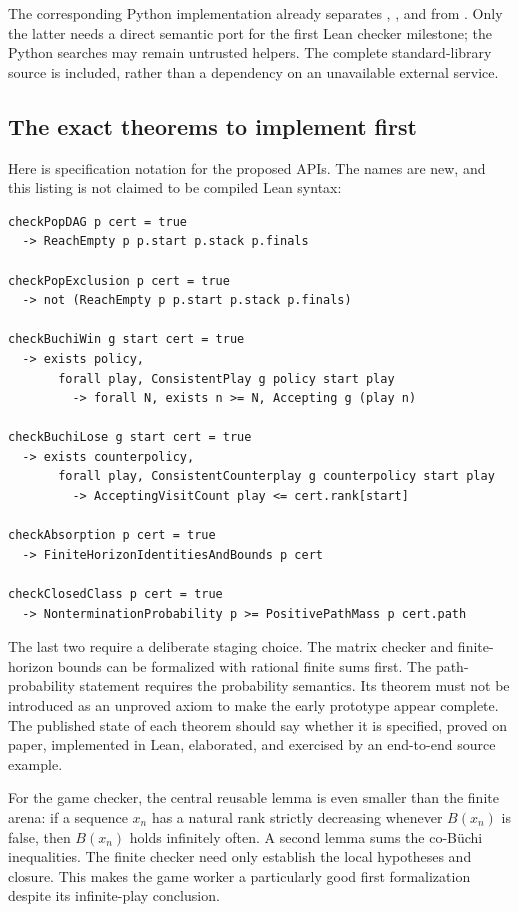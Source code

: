 The corresponding Python implementation already separates
, , and  from
. Only the latter needs a direct semantic port for the first
Lean checker milestone; the Python searches may remain untrusted helpers.
The complete standard-library source is included, rather than a dependency on
an unavailable external service.

\subsection{The exact theorems to implement first}
Here is specification notation for the proposed APIs. The names are new, and
this listing is not claimed to be compiled Lean syntax:
\begin{lstlisting}[caption={Required soundness contracts, with the original model supplied independently.}]
checkPopDAG p cert = true
  -> ReachEmpty p p.start p.stack p.finals

checkPopExclusion p cert = true
  -> not (ReachEmpty p p.start p.stack p.finals)

checkBuchiWin g start cert = true
  -> exists policy,
       forall play, ConsistentPlay g policy start play
         -> forall N, exists n >= N, Accepting g (play n)

checkBuchiLose g start cert = true
  -> exists counterpolicy,
       forall play, ConsistentCounterplay g counterpolicy start play
         -> AcceptingVisitCount play <= cert.rank[start]

checkAbsorption p cert = true
  -> FiniteHorizonIdentitiesAndBounds p cert

checkClosedClass p cert = true
  -> NonterminationProbability p >= PositivePathMass p cert.path
\end{lstlisting}

The last two require a deliberate staging choice. The matrix checker and
finite-horizon bounds can be formalized with rational finite sums first. The
path-probability statement requires the probability semantics. Its theorem
must not be introduced as an unproved axiom to make the early prototype appear
complete. The published state of each theorem should say whether it is
specified, proved on paper, implemented in Lean, elaborated, and exercised by
an end-to-end source example.

For the game checker, the central reusable lemma is even smaller than the
finite arena: if a sequence $x_n$ has a natural rank strictly decreasing
whenever $B(x_n)$ is false, then $B(x_n)$ holds infinitely often. A second lemma
sums the co-B\"uchi inequalities. The finite checker need only establish the
local hypotheses and closure. This makes the game worker a particularly good
first formalization despite its infinite-play conclusion.

